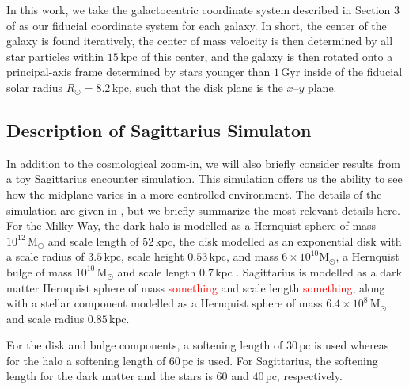 \documentclass[twocolumn]{aastex62}
\newcommand{\Gus}[1]{\textcolor{red}{#1}}
\newcommand{\Msun}{\ensuremath{\text{M}_\odot}}
\newcommand{\pc}{\text{pc}}
\newcommand{\kpc}{\text{kpc}}
\newcommand{\Gyr}{\text{Gyr}}
\begin{document}
In this work, we take the galactocentric coordinate system described in
Section 3 of \citet{2018arXiv180610564S} as our fiducial coordinate system for
each galaxy. In short, the center of the galaxy is found iteratively, the
center of mass velocity is then determined by all star particles within
$15\,\kpc$ of this center, and the galaxy is then rotated onto a
principal-axis frame determined by stars younger than $1\,\Gyr$ inside of the
fiducial solar radius $R_{\odot} = 8.2\,\kpc$, such that the disk plane is the
$x$--$y$ plane.

\subsection{Description of Sagittarius Simulaton} \label{ssec:sag_sim}
In addition to the cosmological zoom-in, we will also briefly consider results
from a toy Sagittarius encounter simulation. This simulation offers us the
ability to see how the midplane varies in a more controlled environment. The
details of the simulation are given in \citet{2018MNRAS.481..286L}, but we
briefly summarize the most relevant details here. For the Milky Way, the dark
halo is modelled as a Hernquist sphere of mass $10^{12}\,\Msun$ and scale
length of $52\,\kpc$, the disk modelled as an exponential disk with a scale
radius of $3.5\,\kpc$, scale height $0.53\,\kpc$, and mass
$6\times10^{10}\Msun$, a Hernquist bulge of mass $10^{10}\,\Msun$ and scale
length $0.7\,\kpc$ \citep{1990ApJ...356..359H}. Sagittarius is modelled as a
dark matter Hernquist sphere of mass \Gus{something} and scale length
\Gus{something}, along with a stellar component modelled as a Hernquist sphere
of mass $6.4\times10^8\,\Msun$ and scale radius $0.85\,\kpc$.

For the disk and bulge components, a softening length of $30\,\pc$ is used
whereas for the halo a softening length of $60\,\pc$ is used. For Sagittarius,
the softening length for the dark matter and the stars is $60$ and $40\,\pc$,
respectively.
\end{document}
